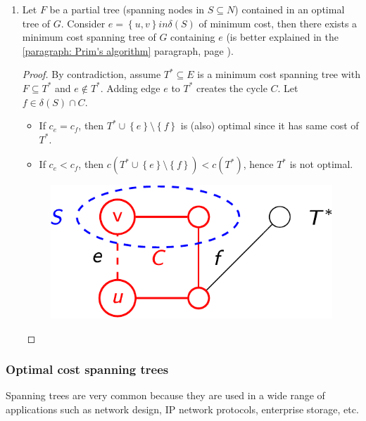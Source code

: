 \begin{enumerate}
    \item Let $F$ be a partial tree (spanning nodes in $S \subseteq N$) contained in an optimal tree of $G$. Consider $e = \left\{u,v\right\} in \delta\left(S\right)$ of minimum cost, then there exists a minimum cost spanning tree of $G$ containing $e$ (is better explained in the \ref{paragraph: Prim's algorithm} paragraph, page \pageref{paragraph: Prim's algorithm}).

    \begin{proof}
        By contradiction, assume $T^{*} \subseteq E$ is a minimum cost spanning tree with $F \subseteq T^{*}$ and $e \notin T^{*}$. Adding edge $e$ to $T^{*}$ creates the cycle $C$. Let $f \in \delta\left(S\right) \cap C$.
        \begin{itemize}
            \item If $c_{e} = c_{f}$, then $T^{*} \cup \left\{e\right\} \setminus \left\{f\right\}$ is (also) optimal since it has same cost of $T^{*}$.
            
            \item If $c_{e} < c_{f}$, then $c\left(T^{*} \cup \left\{e\right\} \setminus \left\{f\right\}\right) < c\left(T^{*}\right)$, hence $T^{*}$ is not optimal.
        \end{itemize}
        \begin{figure}[!htp]
            \centering
            \includegraphics[width=.4\textwidth]{img/trees-9.pdf}
        \end{figure}
    \end{proof}
\end{enumerate}

\newpage

\subsubsection{Optimal cost spanning trees}

Spanning trees are very common because they are used in a wide range of applications such as network design, IP network protocols, enterprise storage, etc.

